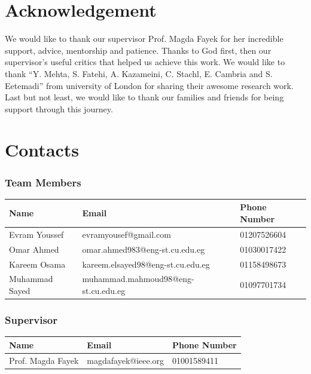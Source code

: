 \documentclass[a4paper,12pt]{report}
\begin{document}
\newpage

\section*{Acknowledgement}
We would like to thank our supervisor Prof. Magda Fayek for her incredible support, advice, mentorship and patience. Thanks to God first, then our supervisor's useful critics that helped us achieve this work.
We would like to thank “Y. Mehta, S. Fatehi, A. Kazameini, C. Stachl, E. Cambria and S. Eetemadi” \cite{yash_personal} from university of London for sharing their awesome research work.\newline
Last but not least, we would like to thank our families and friends for being support through this journey.

\thispagestyle{empty}
\newpage


\section*{Contacts}
\label{sec:contacts}
\subsubsection*{Team Members}
\begin{tabular}{|l | l | l|}
\rowcolor{gray!50}
    \hline
    Name & Email & Phone Number\\\hline\hline
    Evram Youssef & evramyousef@gmail.com  & 01207526604 \\\hline
    Omar Ahmed & omar.ahmed983@eng-st.cu.edu.eg &  01030017422 \\\hline
    Kareem Osama & kareem.elsayed98@eng-st.cu.edu.eg & 01158498673 \\\hline
    Muhammad Sayed & muhammad.mahmoud98@eng-st.cu.edu.eg & 01097701734 \\\hline
\end{tabular}


\subsubsection*{Supervisor}
\begin{tabular}{|l | l | l|}
\rowcolor{gray!50}
    \hline
    Name & Email & Phone Number\\\hline\hline
    Prof. Magda Fayek & magdafayek@ieee.org & 01001589411 \\\hline
\end{tabular}
\end{document}
